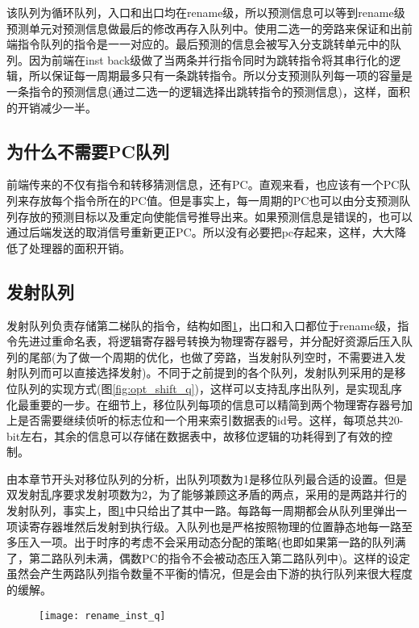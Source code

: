 该队列为循环队列，入口和出口均在rename级，所以预测信息可以等到rename级预测单元对预测信息做最后的修改再存入队列中。使用二选一的旁路来保证和出前端指令队列的指令是一一对应的。最后预测的信息会被写入分支跳转单元中的队列。因为前端在inst back级做了当两条并行指令同时为跳转指令将其串行化的逻辑，所以保证每一周期最多只有一条跳转指令。所以分支预测队列每一项的容量是一条指令的预测信息(通过二选一的逻辑选择出跳转指令的预测信息)，这样，面积的开销减少一半。

\subsection{为什么不需要PC队列}

前端传来的不仅有指令和转移猜测信息，还有PC。直观来看，也应该有一个PC队列来存放每个指令所在的PC值。但是事实上，每一周期的PC也可以由分支预测队列存放的预测目标以及重定向使能信号推导出来。如果预测信息是错误的，也可以通过后端发送的取消信号重新更正PC。所以没有必要把pc存起来，这样，大大降低了处理器的面积开销。

\subsection{发射队列}

发射队列负责存储第二梯队的指令，结构如图\ref{fig:rename_inst_q}，出口和入口都位于rename级，指令先进过重命名表，将逻辑寄存器号转换为物理寄存器号，并分配好资源后压入队列的尾部(为了做一个周期的优化，也做了旁路，当发射队列空时，不需要进入发射队列而可以直接选择发射)。不同于之前提到的各个队列，发射队列采用的是移位队列的实现方式(图\ref{fig:opt_shift_q})，这样可以支持乱序出队列，是实现乱序化最重要的一步。在细节上，移位队列每项的信息可以精简到两个物理寄存器号加上是否需要继续侦听的标志位和一个用来索引数据表的id号。这样，每项总共20-bit左右，其余的信息可以存储在数据表中，故移位逻辑的功耗得到了有效的控制。

由本章节开头对移位队列的分析，出队列项数为1是移位队列最合适的设置。但是双发射乱序要求发射项数为2，为了能够兼顾这矛盾的两点，采用的是两路并行的发射队列，事实上，图\ref{fig:rename_inst_q}中只给出了其中一路。每路每一周期都会从队列里弹出一项读寄存器堆然后发射到执行级。入队列也是严格按照物理的位置静态地每一路至多压入一项。出于时序的考虑不会采用动态分配的策略(也即如果第一路的队列满了，第二路队列未满，偶数PC的指令不会被动态压入第二路队列中)。这样的设定虽然会产生两路队列指令数量不平衡的情况，但是会由下游的执行队列来很大程度的缓解。
\begin{figure}[!htbp]
	\centering
	\texttt{[image: rename\_inst\_q]}
	\label{fig:rename_inst_q}
\end{figure}

